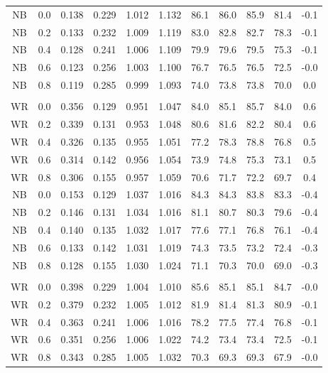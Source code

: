 \begin{table}[p]
\begin{tabular}{@{}ccccccccccc@{}}
NB & 0.0 & 0.138 & 0.229 & 1.012 & 1.132 & 86.1 & 86.0 & 85.9 & 81.4 & -0.1 \\
NB & 0.2 & 0.133 & 0.232 & 1.009 & 1.119 & 83.0 & 82.8 & 82.7 & 78.3 & -0.1 \\
NB & 0.4 & 0.128 & 0.241 & 1.006 & 1.109 & 79.9 & 79.6 & 79.5 & 75.3 & -0.1 \\
NB & 0.6 & 0.123 & 0.256 & 1.003 & 1.100 & 76.7 & 76.5 & 76.5 & 72.5 & -0.0 \\
NB & 0.8 & 0.119 & 0.285 & 0.999 & 1.093 & 74.0 & 73.8 & 73.8 & 70.0 & 0.0 \\
\addlinespace[3pt]
\multicolumn{11}{@{}l}{\textbf{S3: Survival + Continuous ($m=n=239$)}}\\
WR & 0.0 & 0.356 & 0.129 & 0.951 & 1.047 & 84.0 & 85.1 & 85.7 & 84.0 & 0.6 \\
WR & 0.2 & 0.339 & 0.131 & 0.953 & 1.048 & 80.6 & 81.6 & 82.2 & 80.4 & 0.6 \\
WR & 0.4 & 0.326 & 0.135 & 0.955 & 1.051 & 77.2 & 78.3 & 78.8 & 76.8 & 0.5 \\
WR & 0.6 & 0.314 & 0.142 & 0.956 & 1.054 & 73.9 & 74.8 & 75.3 & 73.1 & 0.5 \\
WR & 0.8 & 0.306 & 0.155 & 0.957 & 1.059 & 70.6 & 71.7 & 72.2 & 69.7 & 0.4 \\
NB & 0.0 & 0.153 & 0.129 & 1.037 & 1.016 & 84.3 & 84.3 & 83.8 & 83.3 & -0.4 \\
NB & 0.2 & 0.146 & 0.131 & 1.034 & 1.016 & 81.1 & 80.7 & 80.3 & 79.6 & -0.4 \\
NB & 0.4 & 0.140 & 0.135 & 1.032 & 1.017 & 77.6 & 77.1 & 76.8 & 76.1 & -0.4 \\
NB & 0.6 & 0.133 & 0.142 & 1.031 & 1.019 & 74.3 & 73.5 & 73.2 & 72.4 & -0.3 \\
NB & 0.8 & 0.128 & 0.155 & 1.030 & 1.024 & 71.1 & 70.3 & 70.0 & 69.0 & -0.3 \\
\addlinespace[3pt]
\multicolumn{11}{@{}l}{\textbf{S4: Binary + Continuous ($m=n=239$)}}\\
WR & 0.0 & 0.398 & 0.229 & 1.004 & 1.010 & 85.6 & 85.1 & 85.1 & 84.7 & -0.0 \\
WR & 0.2 & 0.379 & 0.232 & 1.005 & 1.012 & 81.9 & 81.4 & 81.3 & 80.9 & -0.1 \\
WR & 0.4 & 0.363 & 0.241 & 1.006 & 1.016 & 78.2 & 77.5 & 77.4 & 76.8 & -0.1 \\
WR & 0.6 & 0.351 & 0.256 & 1.006 & 1.022 & 74.2 & 73.4 & 73.4 & 72.5 & -0.1 \\
WR & 0.8 & 0.343 & 0.285 & 1.005 & 1.032 & 70.3 & 69.3 & 69.3 & 67.9 & -0.0 \\

\end{tabular}
\end{table}
